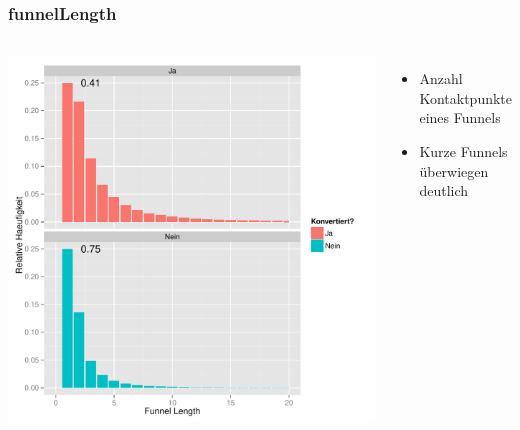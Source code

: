 \begin{frame}\frametitle{funnelLength}
	\begin{columns}
		\column{7cm}
			\includegraphics[scale=0.39]{funnelLength_First.pdf}
		\column{4cm}
			\begin{itemize}
				\item Anzahl Kontaktpunkte eines Funnels
				\item Kurze Funnels überwiegen deutlich
			\end{itemize}
	\end{columns}
\end{frame}


